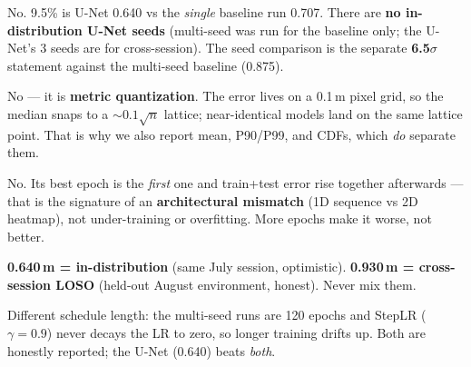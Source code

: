 \documentclass[11pt]{article}
\begin{document}
\begin{trap}
No. 9.5\% is U-Net 0.640 vs the \emph{single} baseline run 0.707. There are \textbf{no in-distribution
U-Net seeds} (multi-seed was run for the baseline only; the U-Net's 3 seeds are for cross-session). The
seed comparison is the separate \textbf{6.5$\sigma$} statement against the multi-seed baseline (0.875).
\end{trap}

\begin{trap}
No --- it is \textbf{metric quantization}. The error lives on a 0.1\,m pixel grid, so the median snaps to
a $\sim0.1\sqrt{n}$ lattice; near-identical models land on the same lattice point. That is why we also
report mean, P90/P99, and CDFs, which \emph{do} separate them.
\end{trap}

\begin{trap}
No. Its best epoch is the \emph{first} one and train+test error rise together afterwards --- that is the
signature of an \textbf{architectural mismatch} (1D sequence vs 2D heatmap), not under-training or
overfitting. More epochs make it worse, not better.
\end{trap}

\begin{trap}
\textbf{0.640\,m = in-distribution} (same July session, optimistic). \textbf{0.930\,m = cross-session
LOSO} (held-out August environment, honest). Never mix them.
\end{trap}

\begin{trap}
Different schedule length: the multi-seed runs are 120 epochs and StepLR ($\gamma{=}0.9$) never decays the
LR to zero, so longer training drifts up. Both are honestly reported; the U-Net (0.640) beats \emph{both}.
\end{trap}
\end{document}
